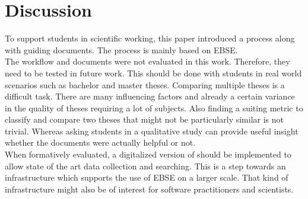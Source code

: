 
\section{Discussion}
\label{sec:discussion}

To support students in scientific working, this paper introduced a process along with guiding documents.
The process is mainly based on EBSE.\\
The workflow and documents were not evaluated in this work. Therefore, they need to be tested in future work. This should be done with students in real world scenarios such as bachelor and master theses. Comparing multiple theses is a difficult task. There are many influencing factors and already a certain variance in the quality of theses requiring a lot of subjects. Also finding a suiting metric to classify and compare two theses that might not be particularly similar is not trivial. Whereas asking students in a qualitative study can provide useful insight whether the documents were actually helpful or not.\\
When formatively evaluated, a digitalized version of \briefingform{} should be implemented to allow state of the art data collection and searching. This is a step towards an infrastructure which supports the use of EBSE on a larger scale. That kind of infrastructure might also be of interest for software practitioners and scientists.
